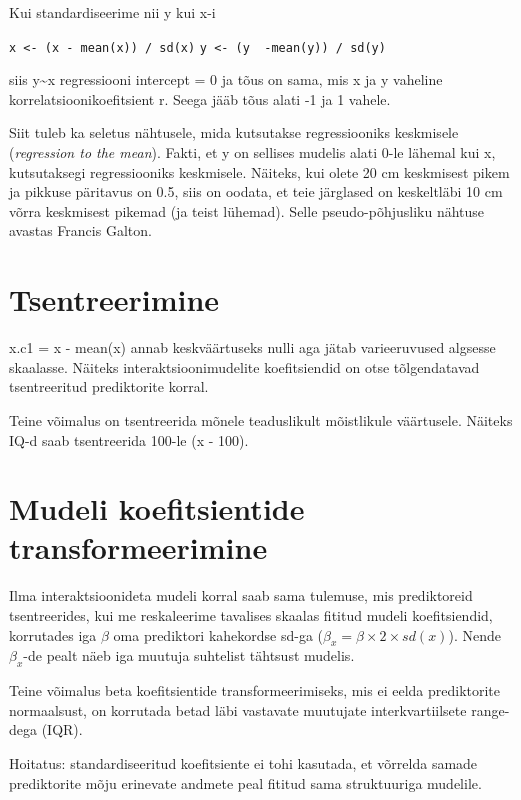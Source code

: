 \documentclass[]{book}
\begin{document}
Kui standardiseerime nii y kui x-i

\texttt{x\ \textless{}-\ (x\ -\ mean(x))\ /\ sd(x)}
\texttt{y\ \textless{}-\ (y\ \ -mean(y))\ /\ sd(y)}

siis y\textasciitilde{}x regressiooni intercept = 0 ja tõus on sama, mis
x ja y vaheline korrelatsioonikoefitsient r. Seega jääb tõus alati -1 ja
1 vahele.

Siit tuleb ka seletus nähtusele, mida kutsutakse regressiooniks
keskmisele (\emph{regression to the mean}). Fakti, et y on sellises
mudelis alati 0-le lähemal kui x, kutsutaksegi regressiooniks
keskmisele. Näiteks, kui olete 20 cm keskmisest pikem ja pikkuse
päritavus on 0.5, siis on oodata, et teie järglased on keskeltläbi 10 cm
võrra keskmisest pikemad (ja teist lühemad). Selle pseudo-põhjusliku
nähtuse avastas Francis Galton.

\section{Tsentreerimine}\label{tsentreerimine}

x.c1 = x - mean(x) annab keskväärtuseks nulli aga jätab varieeruvused
algsesse skaalasse. Näiteks interaktsioonimudelite koefitsiendid on otse
tõlgendatavad tsentreeritud prediktorite korral.

Teine võimalus on tsentreerida mõnele teaduslikult mõistlikule
väärtusele. Näiteks IQ-d saab tsentreerida 100-le (x - 100).

\section{Mudeli koefitsientide
transformeerimine}\label{mudeli-koefitsientide-transformeerimine}

Ilma interaktsioonideta mudeli korral saab sama tulemuse, mis
prediktoreid tsentreerides, kui me reskaleerime tavalises skaalas
fititud mudeli koefitsiendid, korrutades iga \(\beta\) oma prediktori
kahekordse sd-ga (\(\beta_x = \beta \times 2 \times sd(x)\)). Nende
\(\beta_x\)-de pealt näeb iga muutuja suhtelist tähtsust mudelis.

Teine võimalus beta koefitsientide transformeerimiseks, mis ei eelda
prediktorite normaalsust, on korrutada betad läbi vastavate muutujate
interkvartiilsete range-dega (IQR).

Hoitatus: standardiseeritud koefitsiente ei tohi kasutada, et võrrelda
samade prediktorite mõju erinevate andmete peal fititud sama
struktuuriga mudelile.
\end{document}
